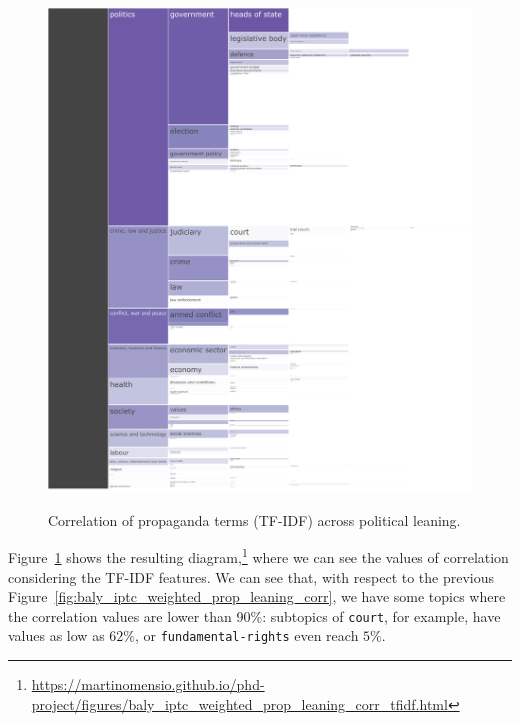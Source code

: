 \begin{figure}[!htbp]
    \centering
    \href{https://martinomensio.github.io/phd-project/figures/baly_iptc_weighted_prop_leaning_corr_tfidf.html}{\includegraphics[trim={2.65cm 0cm 0cm 0cm},clip,width=\linewidth]{figures/baly_iptc_weighted_prop_leaning_corr_tfidf.pdf}}
    \caption{Correlation of propaganda terms (TF-IDF) across political leaning.}
    \label{fig:baly_iptc_weighted_prop_leaning_corr_tfidf}
\end{figure}

Figure~\ref{fig:baly_iptc_weighted_prop_leaning_corr_tfidf} shows the resulting diagram,\footnote{\url{https://martinomensio.github.io/phd-project/figures/baly_iptc_weighted_prop_leaning_corr_tfidf.html}}
where we can see the values of correlation considering the TF-IDF features.
We can see that, with respect to the previous Figure~\ref{fig:baly_iptc_weighted_prop_leaning_corr}, we have some topics where the correlation values are lower than 90\%: subtopics of \texttt{court}, for example, have values as low as $62\%$, or \texttt{fundamental-rights} even reach $5\%$.



